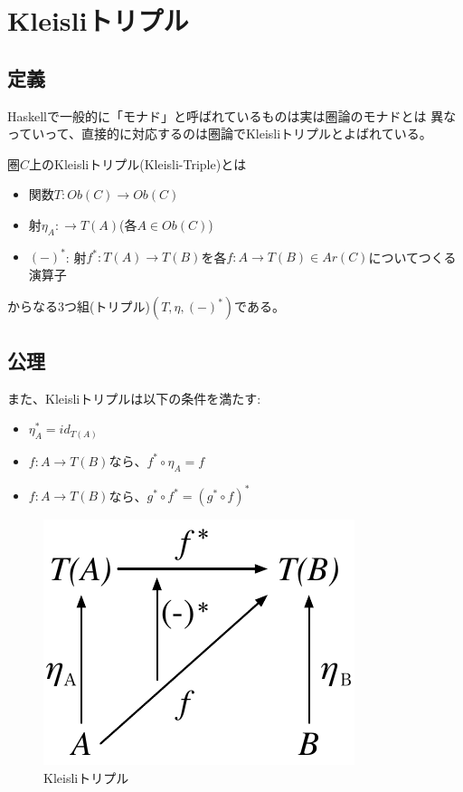 
\newpage
\section{Kleisliトリプル}

\subsection{定義}
Haskellで一般的に「モナド」と呼ばれているものは実は圏論のモナドとは
異なっていって、直接的に対応するのは圏論でKleisliトリプルとよばれている。

圏$C$上のKleisliトリプル(Kleisli-Triple)とは
\begin{itemize}
    \item 関数$T:Ob(C)\to Ob(C)$
    \item 射$\eta_A:\to T(A)$(各$A\in Ob(C)$)
    \item $(-)^*$: 射$f^*:T(A)\to T(B)$を各$f:A\to T(B)\in Ar(C)$についてつくる演算子
\end{itemize}
からなる3つ組(トリプル)$(T, \eta, (-)^*)$である。

\subsection{公理}
また、Kleisliトリプルは以下の条件を満たす:
\begin{itemize}
    \item $\eta_A^*=id_{T(A)}$
    \item $f:A\to T(B)$なら、$f^*\circ \eta_A=f$
    \item $f:A\to T(B)$なら、$g^*\circ f^*=(g^*\circ f)^*$
\end{itemize}

\begin{figure}[htbp]
    \centering
    \includegraphics{diag_kleisli.pdf}
    \caption{Kleisliトリプル}
\end{figure}

